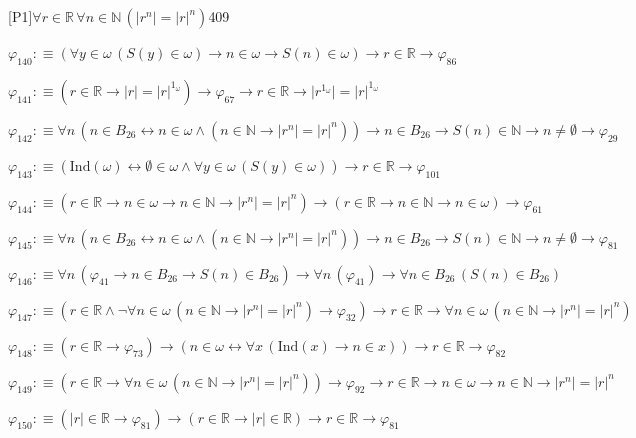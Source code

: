 \begin{fullproof}{[P1]}{$\forall r \in \mathbb{R}\,\forall n \in \mathbb{N}\,(\lvert {{r}^{n}} \rvert = {{\lvert r \rvert}^{n}})$}{409}
\begin{abbrevlist}
\item $\varphi_{140} :\equiv (\forall y \in \omega\,(S(y) \in \omega) \to n \in \omega \to S(n) \in \omega) \to r \in \mathbb{R} \to \varphi_{86}$
\item $\varphi_{141} :\equiv (r \in \mathbb{R} \to \lvert r \rvert = {{\lvert r \rvert}^{1_{\omega}}}) \to \varphi_{67} \to r \in \mathbb{R} \to \lvert {{r}^{1_{\omega}}} \rvert = {{\lvert r \rvert}^{1_{\omega}}}$
\item $\varphi_{142} :\equiv \forall n\,(n \in B_{26} \leftrightarrow n \in \omega \land (n \in \mathbb{N} \to \lvert {{r}^{n}} \rvert = {{\lvert r \rvert}^{n}})) \to n \in B_{26} \to S(n) \in \mathbb{N} \to n \neq \emptyset \to \varphi_{29}$
\item $\varphi_{143} :\equiv (\mathrm{Ind}(\omega) \leftrightarrow \emptyset \in \omega \land \forall y \in \omega\,(S(y) \in \omega)) \to r \in \mathbb{R} \to \varphi_{101}$
\item $\varphi_{144} :\equiv (r \in \mathbb{R} \to n \in \omega \to n \in \mathbb{N} \to \lvert {{r}^{n}} \rvert = {{\lvert r \rvert}^{n}}) \to (r \in \mathbb{R} \to n \in \mathbb{N} \to n \in \omega) \to \varphi_{61}$
\item $\varphi_{145} :\equiv \forall n\,(n \in B_{26} \leftrightarrow n \in \omega \land (n \in \mathbb{N} \to \lvert {{r}^{n}} \rvert = {{\lvert r \rvert}^{n}})) \to n \in B_{26} \to S(n) \in \mathbb{N} \to n \neq \emptyset \to \varphi_{81}$
\item $\varphi_{146} :\equiv \forall n\,(\varphi_{41} \to n \in B_{26} \to S(n) \in B_{26}) \to \forall n\,(\varphi_{41}) \to \forall n \in B_{26}\,(S(n) \in B_{26})$
\item $\varphi_{147} :\equiv (r \in \mathbb{R} \land \neg \forall n \in \omega\,(n \in \mathbb{N} \to \lvert {{r}^{n}} \rvert = {{\lvert r \rvert}^{n}}) \to \varphi_{32}) \to r \in \mathbb{R} \to \forall n \in \omega\,(n \in \mathbb{N} \to \lvert {{r}^{n}} \rvert = {{\lvert r \rvert}^{n}})$
\item $\varphi_{148} :\equiv (r \in \mathbb{R} \to \varphi_{73}) \to (n \in \omega \leftrightarrow \forall x\,(\mathrm{Ind}(x) \to n \in x)) \to r \in \mathbb{R} \to \varphi_{82}$
\item $\varphi_{149} :\equiv (r \in \mathbb{R} \to \forall n \in \omega\,(n \in \mathbb{N} \to \lvert {{r}^{n}} \rvert = {{\lvert r \rvert}^{n}})) \to \varphi_{92} \to r \in \mathbb{R} \to n \in \omega \to n \in \mathbb{N} \to \lvert {{r}^{n}} \rvert = {{\lvert r \rvert}^{n}}$
\item $\varphi_{150} :\equiv (\lvert r \rvert \in \mathbb{R} \to \varphi_{81}) \to (r \in \mathbb{R} \to \lvert r \rvert \in \mathbb{R}) \to r \in \mathbb{R} \to \varphi_{81}$

\end{abbrevlist}
\end{fullproof}

